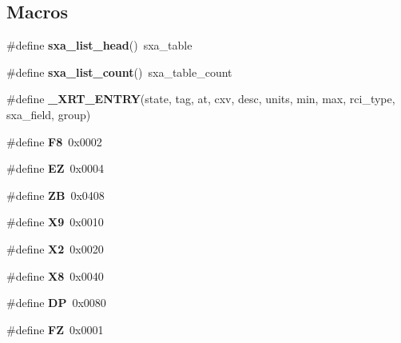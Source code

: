 \subsection*{Macros}
\begin{DoxyCompactItemize}
\item 
\mbox{\label{group___s_x_a_ga27795359331f2e44d8d40c1b9163a674}} 
\#define {\bfseries sxa\+\_\+list\+\_\+head}()~sxa\+\_\+table
\item 
\mbox{\label{group___s_x_a_gab0d9a6292749d033909b792227bd85ad}} 
\#define {\bfseries sxa\+\_\+list\+\_\+count}()~sxa\+\_\+table\+\_\+count
\item 
\#define {\bfseries \+\_\+\+X\+R\+T\+\_\+\+E\+N\+T\+RY}(state,  tag,  at,  cxv,  desc,  units,  min,  max,  rci\+\_\+type,  sxa\+\_\+field,  group)
\item 
\mbox{\label{group___s_x_a_gaebf0bdb7cd47b4d4c612c2cadee1a743}} 
\#define {\bfseries F8}~0x0002
\item 
\mbox{\label{group___s_x_a_gaa58c02315d6d183636fa06f91600855c}} 
\#define {\bfseries EZ}~0x0004
\item 
\mbox{\label{group___s_x_a_ga7c41685fef06e2a89abc69a7edfb4500}} 
\#define {\bfseries ZB}~0x0408
\item 
\mbox{\label{group___s_x_a_ga415a5793bb5269705fcb36b6d3800952}} 
\#define {\bfseries X9}~0x0010
\item 
\mbox{\label{group___s_x_a_ga79ae03a0214cb30e57b9e8835f2a0019}} 
\#define {\bfseries X2}~0x0020
\item 
\mbox{\label{group___s_x_a_ga97d09b56987fc327100f41788e1b26db}} 
\#define {\bfseries X8}~0x0040
\item 
\mbox{\label{group___s_x_a_gab3383e72bb58d5e6faf0501cd117acfa}} 
\#define {\bfseries DP}~0x0080
\item 
\mbox{\label{group___s_x_a_gab288c4e26b9e229231ba0f0f6b039b62}} 
\#define {\bfseries FZ}~0x0001
\item 

\end{DoxyCompactItemize}

